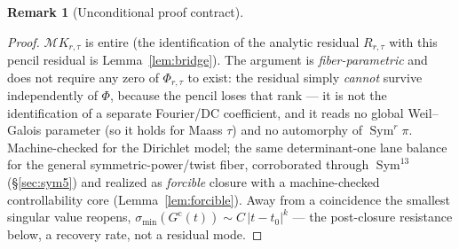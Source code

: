 \documentclass[11pt]{article}
\theoremstyle{definition}
\newtheorem{remark}[theorem]{Remark}
\newcommand{\Sym}{\operatorname{Sym}}
\begin{document}
\begin{remark}[Unconditional proof contract]
\begin{enumerate}
\begin{proof}
$\mathcal M K_{r,\tau}$ is entire (the identification of the analytic residual $R_{r,\tau}$ with this pencil residual is Lemma~\ref{lem:bridge}).
The argument is \emph{fiber-parametric} and does not require any zero of $\Phi_{r,\tau}$ to exist: the
residual simply \emph{cannot} survive independently of $\Phi$, because the pencil loses that rank --- it is
not the identification of a separate Fourier/DC coefficient, and it reads no global Weil--Galois parameter
(so it holds for Maass $\tau$) and no automorphy of $\Sym^r\pi$. Machine-checked for the Dirichlet model;
the same determinant-one lane balance for the general symmetric-power/twist fiber, corroborated through
$\Sym^{13}$ (\S\ref{sec:sym5}) and realized as \emph{forcible} closure with a machine-checked
controllability core (Lemma~\ref{lem:forcible}). Away from a coincidence the smallest singular value reopens,
$\sigma_{\min}(G^{\mathrm c}(t))\sim C\,|t-t_0|^{k}$ --- the post-closure resistance below, a recovery rate,
not a residual mode.
\end{proof}


\end{enumerate}
\end{remark}
\end{document}
